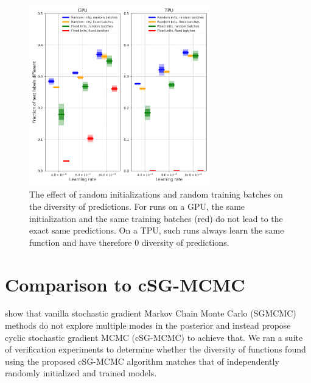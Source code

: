 \documentclass{article}
\newcommand{\reducespaceafterfigure}{\vspace{-1em}} %
\begin{document}
  \begin{figure}[ht]%
    \centering%
      \includegraphics[width=0.7\textwidth]{figures/diversity_sources_comparison_GPUvsTPU.png}
      \reducespaceafterfigure
    \caption{The effect of random initializations and random training batches on the diversity of predictions. For runs on a GPU, the same initialization and the same training batches (red) do not lead to the exact same predictions. On a TPU, such runs always learn the same function and have therefore 0 diversity of predictions.}
    \label{fig:randomness}%
\end{figure}%
 





%
%
%
%

%
%
%
%
%
%
%
%

%
%
%
%
%
%
%
%
%
%
%
%
%
%
%
%

%
%

%
%
%
%
%
%
%
%

%
%
%
%
%
%
%
%
%
%
%
%
%
%
%
%
%
%
%
%
%
%
%
%
%
%
%
%
%
%
%
%
%







%



%
%



%
 
%
%
%
%
%
%
 
%
%


%

\section{Comparison to cSG-MCMC}\label{sec:csgmcmc}
%
\citet{Zhang2020Cyclical} show that vanilla stochastic gradient Markov Chain Monte Carlo (SGMCMC) methods do not explore multiple modes in the posterior and instead propose cyclic stochastic gradient MCMC (cSG-MCMC) to achieve that. We ran a suite of verification experiments to determine whether the diversity of functions found using the proposed cSG-MCMC algorithm matches that of independently randomly initialized and trained models.  %
\end{document}
